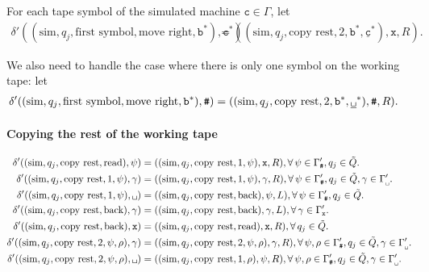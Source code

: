 \documentclass{article}
\newcommand{\obullet}[1]{\ensuremath{#1^*}}
\newcommand{\0}{\texttt{\textvisiblespace}}
\newcommand{\°}{\obullet{\0}}
\newcommand{\BB}{\obullet{\underline{\0}}}
\newcommand{\Q}{\obullet{\w}}
\renewcommand{\C}{\obullet{\y}}
\newcommand{\HC}{\obullet{\underline{\y}}}
\newcommand{\w}{\texttt{b}}
\newcommand{\y}{\texttt{c}}
\newcommand{\X}{\texttt{x}}
\newcommand{\e}{\texttt{\#}}
\newcommand{\gpwb}{\Gamma'_{\0{}}}
\newcommand{\gpwx}{\Gamma'_{\X{}}}
\newcommand{\gpwe}{\Gamma'_{\e{}}}
\newcommand{\qwar}{\tilde{Q}}
\begin{document}
For each tape symbol of the simulated machine $\y \in \Gamma$,
let
\begin{align}
  \delta'((\text{sim}, q_j, \text{first symbol}, \text{move right}, \Q), \C)
  &=
  ((\text{sim}, q_j, \text{copy rest}, 2, \Q, \HC),\X,R).
\end{align}

We also need to handle the case where there is only one symbol on the working
tape:
let
\begin{align}
  \delta'((\text{sim}, q_j, \text{first symbol}, \text{move right}, \Q), \e)
  &=
  ((\text{sim}, q_j, \text{copy rest}, 2, \Q, \BB),\e,R).
\end{align}

\paragraph{Copying the rest of the working tape}

\begin{align}
  \delta'((\text{sim},q_j,\text{copy rest}, \text{read}), \psi)
  &= ((\text{sim},q_j, \text{copy rest},1, \psi), \X, R),
  \forall\,
  \psi \in\gpwe,
  q_j \in \qwar.\\
  \delta'((\text{sim}, q_j, \text{copy rest}, 1, \psi), \gamma)
  &= ((\text{sim}, q_j, \text{copy rest}, 1, \psi), \gamma, R),
  \forall\,
  \psi \in\gpwe,
  q_j \in \qwar,
  \gamma \in \gpwb.\\
  \delta'((\text{sim},q_j, \text{copy rest},1, \psi), \0{})
  &= ((\text{sim}, q_j, \text{copy rest}, \text{back}), \psi, L),
  \forall\,
  \psi \in\gpwe,
  q_j \in \qwar.\\
  \delta'((\text{sim}, q_j, \text{copy rest}, \text{back}), \gamma)
  &= ((\text{sim}, q_j, \text{copy rest}, \text{back}), \gamma, L),
  \forall\,\gamma \in \gpwx.\\
  \delta'((\text{sim}, q_j, \text{copy rest}, \text{back}), \X)
  &= ((\text{sim}, q_j, \text{copy rest}, \text{read}), \X, R),
  \forall\,
  q_j \in \qwar.\\
  \delta'((\text{sim}, q_j, \text{copy rest}, 2, \psi, \rho), \gamma)
  &= ((\text{sim}, q_j, \text{copy rest}, 2, \psi, \rho), \gamma, R),
  \forall\,
  \psi,\rho \in \gpwe,
  q_j \in \qwar,
  \gamma \in \gpwb.\\
  \delta'((\text{sim}, q_j, \text{copy rest}, 2, \psi, \rho), \0{})
  &= ((\text{sim}, q_j, \text{copy rest}, 1, \rho), \psi, R),
  \forall\,
  \psi,\rho \in \gpwe,
  q_j \in \qwar,
  \gamma \in\gpwb.
\end{align}
\end{document}
